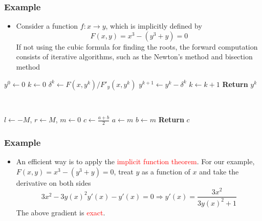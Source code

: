 \documentclass{beamer}
\begin{document}
\begin{frame}
	\frametitle{Example}

	\begin{itemize}
		\item Consider a function $f:x\rightarrow y$, which is implicitly defined by
		      $$F(x,y) = x^3 - (y^3+y) = 0$$
		      If not using the cubic formula for finding the roots, the forward computation consists of iterative algorithms, such as the Newton's method and bisection method
	\end{itemize}



	\begin{minipage}[t]{0.48\textwidth}
		\centering
		\begin{algorithmic}
			\State $y^0 \gets 0$
			\State $k \gets 0$
			\State $\delta^k \gets F(x, y^k)/F'_y(x,y^k)$
			\State $y^{k+1}\gets y^k - \delta^k$
			\State $k \gets k+1$
			\EndWhile
			\State \textbf{Return} $y^k$
		\end{algorithmic}
	\end{minipage}~
	\begin{minipage}[t]{0.48\textwidth}
		\centering
		\begin{algorithmic}
			\State $l \gets -M$, $r\gets M$, $m\gets 0$
			\While {$|F(x, m)|>\epsilon$}
			\State $c \gets \frac{a+b}{2}$
			\If{$F(x, m)>0$}
			\State $a\gets m$
			\Else
			\State $b\gets m$
			\EndIf
			\EndWhile
			\State \textbf{Return} $c$
		\end{algorithmic}

	\end{minipage}

\end{frame}

\begin{frame}
	\frametitle{Example}

	\begin{itemize}
		\item An efficient way is to apply the \textcolor{red}{implicit function theorem}. For our example, $F(x,y)=x^3-(y^3+y)=0$, treat $y$ as a function of $x$ and take the derivative on both sides
		      $$3x^2 - 3y(x)^2y'(x)-y'(x)=0\Rightarrow y'(x) = \frac{3x^2}{3y(x)^2+1}$$
		      The above gradient is \textcolor{red}{exact}.
	\end{itemize}

\end{frame}
\end{document}

